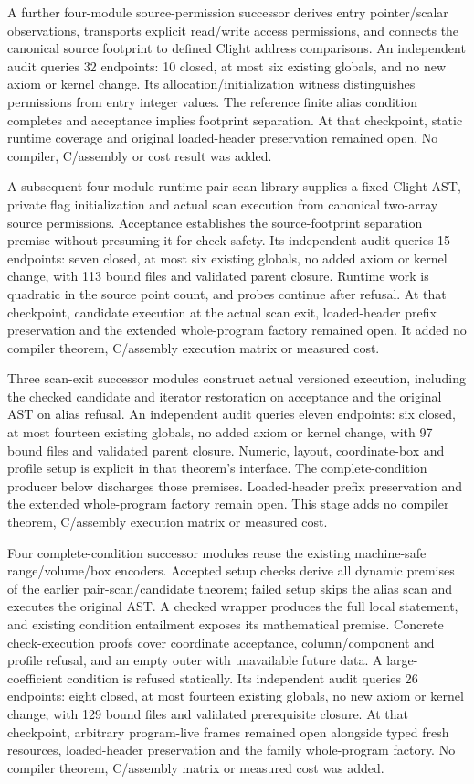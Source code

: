 A further four-module source-permission successor derives entry pointer/scalar
observations, transports explicit read/write access permissions, and connects
the canonical source footprint to defined Clight address comparisons. An
independent audit queries 32 endpoints: 10 closed, at most six existing globals,
and no new axiom or kernel change. Its
allocation/initialization witness distinguishes permissions from entry integer
values. The reference finite alias condition completes and acceptance implies
footprint separation. At that checkpoint, static runtime coverage and original
loaded-header preservation remained open. No compiler, C/assembly or cost
result was added.

A subsequent four-module runtime pair-scan library supplies a fixed Clight AST,
private flag initialization and actual scan execution from canonical two-array
source permissions. Acceptance establishes the source-footprint separation
premise without presuming it for check safety. Its independent audit queries
15 endpoints: seven closed, at most six existing globals, no added axiom or
kernel change, with 113 bound files and validated parent closure. Runtime work
is quadratic in the source point count, and probes continue after refusal.
At that checkpoint, candidate execution at the actual scan exit, loaded-header
prefix preservation and the extended whole-program factory remained open.
It added no compiler theorem, C/assembly execution matrix or measured cost.

Three scan-exit successor modules construct actual versioned execution,
including the checked candidate and iterator restoration on acceptance and
the original AST on alias refusal. An independent audit queries eleven
endpoints: six closed, at most fourteen existing globals, no added axiom or
kernel change, with 97 bound files and validated parent closure. Numeric,
layout, coordinate-box and profile setup is explicit in that theorem's
interface. The complete-condition producer below discharges those premises.
Loaded-header prefix preservation and the extended whole-program factory
remain open. This stage adds no compiler
theorem, C/assembly execution matrix or measured cost.

Four complete-condition successor modules reuse the existing machine-safe
range/volume/box encoders. Accepted setup checks derive all dynamic premises
of the earlier pair-scan/candidate theorem; failed setup skips the alias scan
and executes the original AST. A checked wrapper produces the full local
statement, and existing condition entailment exposes its mathematical premise.
Concrete check-execution proofs cover coordinate acceptance, column/component
and profile refusal, and an empty outer with unavailable future data. A
large-coefficient condition is refused statically. Its independent audit
queries 26 endpoints: eight closed, at most fourteen existing globals, no new
axiom or kernel change, with 129 bound files and validated prerequisite
closure. At that checkpoint, arbitrary program-live frames remained open
alongside typed fresh resources, loaded-header preservation and the family
whole-program factory. No compiler theorem, C/assembly matrix or measured
cost was added.


